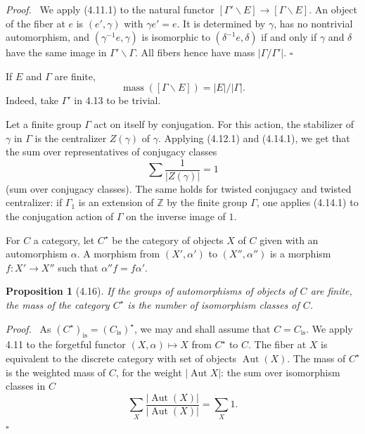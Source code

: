 \documentclass[10pt]{article}
\newcommand{\Aut}{\operatorname{Aut}}
\newcommand{\mass}{\operatorname{mass}}
\theoremstyle{deligne}
\newtheorem*{proposition*}{Proposition}
\newenvironment{proofdel}[1][Proof.]{\textit{#1}\ }{\hfill$\square$}
\newcommand{\heading}[1]{\vspace{0.7em}\noindent{\bfseries #1}\quad}
\begin{document}
\begin{proofdel}
We apply (4.11.1) to the natural functor $[\Gamma'\backslash E]\to[\Gamma\backslash E]$. An object of the fiber at $e$ is $(e',\gamma)$ with $\gamma e'=e$. It is determined by $\gamma$, has no nontrivial automorphism, and $(\gamma^{-1}e,\gamma)$ is isomorphic to $(\delta^{-1}e,\delta)$ if and only if $\gamma$ and $\delta$ have the same image in $\Gamma'\backslash\Gamma$. All fibers hence have mass $|\Gamma/\Gamma'|$.
\end{proofdel}

\heading{Example 4.14.} If $E$ and $\Gamma$ are finite,
\begin{equation}\tag{4.14.1}
\mass([\Gamma\backslash E])=|E|/|\Gamma|.
\end{equation}
Indeed, take $\Gamma'$ in 4.13 to be trivial.

\heading{Example 4.15.} Let a finite group $\Gamma$ act on itself by conjugation. For this action, the stabilizer of $\gamma$ in $\Gamma$ is the centralizer $Z(\gamma)$ of $\gamma$. Applying (4.12.1) and (4.14.1), we get that the sum over representatives of conjugacy classes
\begin{equation}\tag{4.15.1}
\sum \frac1{|Z(\gamma)|}=1
\end{equation}
(sum over conjugacy classes). The same holds for twisted conjugacy and twisted centralizer: if $\Gamma_1$ is an extension of $\mathbb Z$ by the finite group $\Gamma$, one applies (4.14.1) to the conjugation action of $\Gamma$ on the inverse image of $1$.

For $C$ a category, let $C^\star$ be the category of objects $X$ of $C$ given with an automorphism $\alpha$. A morphism from $(X',\alpha')$ to $(X'',\alpha'')$ is a morphism $f:X'\to X''$ such that $\alpha''f=f\alpha'$.

\begin{proposition*}[4.16]
If the groups of automorphisms of objects of $C$ are finite, the mass of the category $C^\star$ is the number of isomorphism classes of $C$.
\end{proposition*}

\begin{proofdel}
As $(C^\star)_{\mathrm{is}}=(C_{\mathrm{is}})^\star$, we may and shall assume that $C=C_{\mathrm{is}}$. We apply 4.11 to the forgetful functor $(X,\alpha)\mapsto X$ from $C^\star$ to $C$. The fiber at $X$ is equivalent to the discrete category with set of objects $\Aut(X)$. The mass of $C^\star$ is the weighted mass of $C$, for the weight $|\Aut X|$: the sum over isomorphism classes in $C$
\[
\sum_X \frac{|\Aut(X)|}{|\Aut(X)|}=\sum_X 1.
\]
\end{proofdel}
\end{document}
